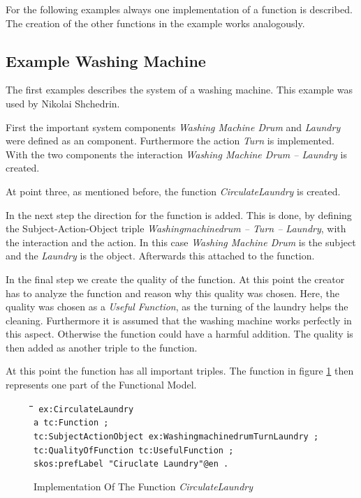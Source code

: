\documentclass[11pt,a4paper]{article}
\newenvironment{code}{\tt \begin{tabbing}
\hskip12pt\=\hskip12pt\=\hskip12pt\=\hskip12pt\=\hskip5cm\=\hskip5cm\=\kill}
{\end{tabbing}}
\begin{document}
For the following examples always one implementation of a function is
described.  The creation of the other functions in the example works
analogously.

\subsection{Example Washing Machine}

The first examples describes the system of a washing machine.  This example
was used by Nikolai Shchedrin.

First the important system components \emph{Washing Machine Drum} and
\emph{Laundry} were defined as an component.  Furthermore the action
\emph{Turn} is implemented.  With the two components the interaction
\emph{Washing Machine Drum -- Laundry} is created.

At point three, as mentioned before, the function \emph{CirculateLaundry} is
created.

In the next step the direction for the function is added.  This is done, by
defining the Subject-Action-Object triple \emph{Washingmachinedrum -- Turn --
  Laundry}, with the interaction and the action.  In this case \emph{Washing
  Machine Drum} is the subject and the \emph{Laundry} is the object.
Afterwards this attached to the function.

In the final step we create the quality of the function.  At this point the
creator has to analyze the function and reason why this quality was chosen.
Here, the quality was chosen as a \emph{Useful Function}, as the turning of
the laundry helps the cleaning.  Furthermore it is assumed that the washing
machine works perfectly in this aspect.  Otherwise the function could have a
harmful addition.  The quality is then added as another triple to the
function.

At this point the function has all important triples.  The function in figure
\ref{fig:implementation_function_circulate_laundry} then represents one part
of the Functional Model.

\begin{figure}[ht]
  \centering
  \begin{code}\tt
    ex:CirculateLaundry\\
    \> a tc:Function ;\\
    \> tc:SubjectActionObject ex:WashingmachinedrumTurnLaundry ;\\
    \> tc:QualityOfFunction tc:UsefulFunction ;\\
    \> skos:prefLabel "Ciruclate Laundry"@en .\\
  \end{code}
  \caption{Implementation Of The Function \emph{CirculateLaundry}}
  \label{fig:implementation_function_circulate_laundry}
\end{figure}
\end{document}
